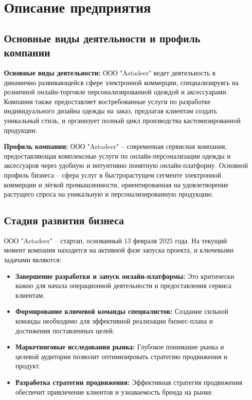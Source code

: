 \newpage

\section{Описание предприятия}

\subsection{Основные виды деятельности и профиль компании}

\textbf{Основные виды деятельности:} ООО "Astadeer" ведет деятельность в динамично развивающейся сфере электронной коммерции, специализируясь на розничной онлайн-торговле персонализированной одеждой и аксессуарами.  Компания также предоставляет востребованные услуги по разработке индивидуального дизайна одежды на заказ, предлагая клиентам создать уникальный стиль, и организует полный цикл производства кастомизированной продукции.

\vspace{0.3cm}

\textbf{Профиль компании:} ООО "Astadeer" – современная сервисная компания, предоставляющая комплексные услуги по онлайн-персонализации одежды и аксессуаров через удобную и интуитивно понятную онлайн-платформу.  Основной профиль бизнеса – сфера услуг в быстрорастущем сегменте электронной коммерции и лёгкой промышленности, ориентированная на удовлетворение растущего спроса на уникальную и персонализированную продукцию.

\subsection{Стадия развития бизнеса}

ООО "Astadeer" – стартап, основанный 13 февраля 2025 года.  На текущий момент компания находится на активной фазе запуска проекта, и ключевыми задачами являются:

\begin{itemize}
    \item \textbf{Завершение разработки и запуск онлайн-платформы:}  Это критически важно для начала операционной деятельности и предоставления сервиса клиентам.
    \item \textbf{Формирование ключевой команды специалистов:}  Создание сильной команды необходимо для эффективной реализации бизнес-плана и достижения поставленных целей.
    \item \textbf{Маркетинговые исследования рынка:}  Глубокое понимание рынка и целевой аудитории позволит оптимизировать стратегию продвижения и продукт.
    \item \textbf{Разработка стратегии продвижения:}  Эффективная стратегия продвижения обеспечит привлечение клиентов и узнаваемость бренда на рынке.
\end{itemize}

